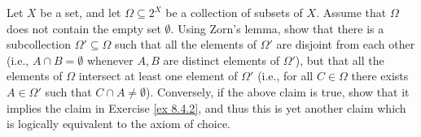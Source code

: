 \begin{exercise}\label{ex 8.5.20}
    Let \(X\) be a set, and let \(\Omega \subseteq 2^X\) be a collection of subsets of \(X\).
    Assume that \(\Omega\) does not contain the empty set \(\emptyset\).
    Using Zorn's lemma, show that there is a subcollection \(\Omega' \subseteq \Omega\) such that all the elements of \(\Omega'\) are disjoint from each other (i.e., \(A \cap B = \emptyset\) whenever \(A, B\) are distinct elements of \(\Omega'\)), but that all the elements of \(\Omega\) intersect at least one element of \(\Omega'\) (i.e., for all \(C \in \Omega\) there exists \(A \in \Omega'\) such that \(C \cap A \neq \emptyset\)).
    Conversely, if the above claim is true, show that it implies the claim in Exercise \ref{ex 8.4.2}, and thus this is yet another claim which is logically equivalent to the axiom of choice.
\end{exercise}